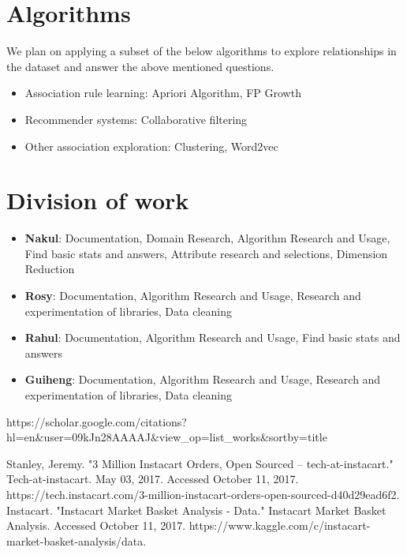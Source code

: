 \documentclass[12pt]{article}
\begin{document}
\section{Algorithms}
We plan on applying a subset of the below algorithms to explore relationships in the dataset and answer the above mentioned questions.

\begin{itemize}
	\item Association rule learning: Apriori Algorithm, FP Growth
	\item Recommender systems: Collaborative filtering
	\item Other association exploration: Clustering, Word2vec 
\end{itemize}
 
\section{Division of work}
\begin{itemize}
	\item \textbf{Nakul}: 
Documentation, Domain Research, Algorithm Research and Usage, Find basic stats and answers, Attribute research and selections, Dimension Reduction
	\item \textbf{Rosy}:
Documentation, Algorithm Research and Usage, Research and experimentation of libraries, Data cleaning
	\item \textbf{Rahul}:
Documentation, Algorithm Research and Usage, Find basic stats and answers 
	\item \textbf{Guiheng}:
Documentation, Algorithm Research and Usage, Research and experimentation of libraries, Data cleaning

\end{itemize}

\begin{thebibliography}{99}

 https://scholar.google.com/citations?hl=en\&user=09kJn28AAAAJ&view_op=list_works&sortby=title

 Stanley, Jeremy. "3 Million Instacart Orders, Open Sourced – tech-at-instacart." Tech-at-instacart. May 03, 2017. Accessed October 11, 2017. https://tech.instacart.com/3-million-instacart-orders-open-sourced-d40d29ead6f2.
Instacart. "Instacart Market Basket Analysis - Data." Instacart Market Basket Analysis. Accessed October 11, 2017. https://www.kaggle.com/c/instacart-market-basket-analysis/data.
\end{thebibliography}
\end{document}
